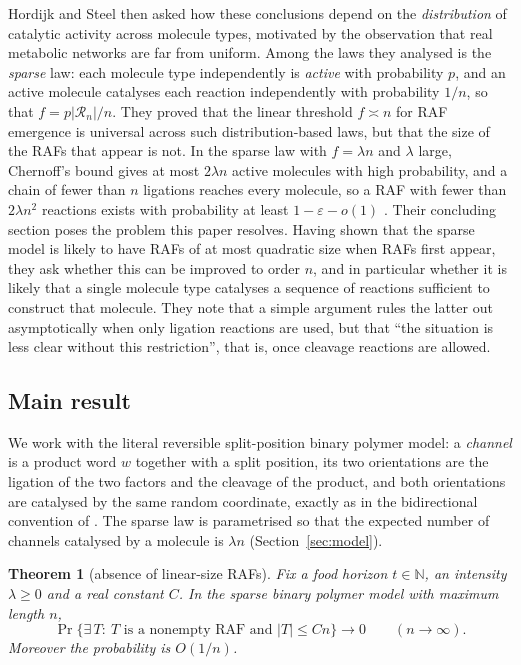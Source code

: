 \documentclass[11pt,a4paper]{article}
\theoremstyle{plain}
\newtheorem{theorem}{Theorem}[section]
\theoremstyle{definition}
\theoremstyle{remark}
\newcommand{\Nat}{\mathbb N}
\newcommand{\cR}{\mathcal R}
\begin{document}
Hordijk and Steel \cite{hordijk2016variable,hordijk2017chasing} then asked how these conclusions depend on the \emph{distribution} of catalytic activity across molecule types, motivated by the observation that real metabolic networks are far from uniform. Among the laws they analysed is the \emph{sparse} law: each molecule type independently is \emph{active} with probability $p$, and an active molecule catalyses each reaction independently with probability $1/n$, so that $f=p|\cR_n|/n$. They proved that the linear threshold $f\asymp n$ for RAF emergence is universal across such distribution-based laws, but that the size of the RAFs that appear is not. In the sparse law with $f=\lambda n$ and $\lambda$ large, Chernoff's bound gives at most $2\lambda n$ active molecules with high probability, and a chain of fewer than $n$ ligations reaches every molecule, so a RAF with fewer than $2\lambda n^2$ reactions exists with probability at least $1-\varepsilon-o(1)$ \cite[Corollary~2]{hordijk2016variable}. Their concluding section \cite[Section~7]{hordijk2016variable} poses the problem this paper resolves. Having shown that the sparse model is likely to have RAFs of at most quadratic size when RAFs first appear, they ask whether this can be improved to order $n$, and in particular whether it is likely that a single molecule type catalyses a sequence of reactions sufficient to construct that molecule. They note that a simple argument rules the latter out asymptotically when only ligation reactions are used, but that ``the situation is less clear without this restriction'', that is, once cleavage reactions are allowed.

\subsection{Main result}

We work with the literal reversible split-position binary polymer model: a \emph{channel} is a product word $w$ together with a split position, its two orientations are the ligation of the two factors and the cleavage of the product, and both orientations are catalysed by the same random coordinate, exactly as in the bidirectional convention of \cite{hordijk2016variable}. The sparse law is parametrised so that the expected number of channels catalysed by a molecule is $\lambda n$ (Section~\ref{sec:model}).

\begin{theorem}[absence of linear-size RAFs]\label{thm:main}
Fix a food horizon $t\in\Nat$, an intensity $\lambda\ge 0$ and a real constant $C$. In the sparse binary polymer model with maximum length $n$,
\begin{equation}\label{eq:main}
\Pr\bigl\{\exists\,T:\ T\text{ is a nonempty RAF and }|T|\le Cn\bigr\}\longrightarrow 0\qquad(n\to\infty).
\end{equation}
Moreover the probability is $O(1/n)$.
\end{theorem}
\end{document}
